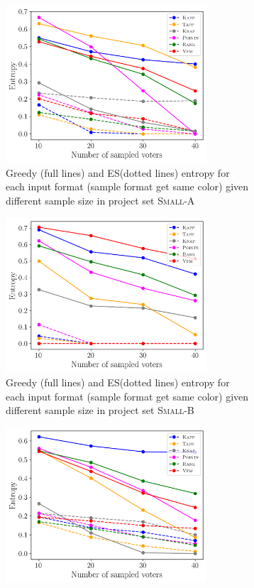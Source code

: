 \documentclass[letterpaper]{article} %
\newcommand{\mes}{ES}
\begin{document}
\begin{figure}[!h]
     \centering
          \begin{subfigure}[b]{0.45\textwidth}
         \centering
        \includegraphics[width=7.5cm]{experiment/entropy_small_a.png}
\caption{Greedy (full lines) and \mes (dotted lines) entropy  for each input format (sample format get same color) given different sample size in project set \textsc{Small-A} }\label{fig:entropy_sa}
     \end{subfigure}\hfill
     \begin{subfigure}[b]{0.45\textwidth}
         \centering
         \includegraphics[width=7.5cm]{experiment/entropy_small_b.png}
\caption{Greedy (full lines) and \mes (dotted lines) entropy  for each input format (sample format get same color) given different sample size in project set \textsc{Small-B}}\label{fig:entropy_sb}
     \end{subfigure}
     \hfill
     \begin{subfigure}[b]{0.45\textwidth}
         \centering
         \includegraphics[width=7.5cm]{experiment/entropy_large_a.png}

\end{subfigure}
\end{figure}
\end{document}
